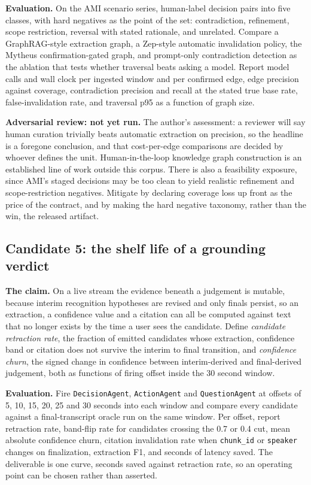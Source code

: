 \textbf{Evaluation.} On the AMI scenario series, human-label decision pairs
into five classes, with hard negatives as the point of the set: contradiction,
refinement, scope restriction, reversal with stated rationale, and unrelated.
Compare a GraphRAG-style extraction graph, a Zep-style automatic invalidation
policy, the Mytheus confirmation-gated graph, and prompt-only contradiction
detection as the ablation that tests whether traversal beats asking a model.
Report model calls and wall clock per ingested window and per confirmed edge,
edge precision against coverage, contradiction precision and recall at the
stated true base rate, false-invalidation rate, and traversal p95 as a function
of graph size.

\textbf{Adversarial review: not yet run.} The author's assessment: a reviewer
will say human curation trivially beats automatic extraction on precision, so
the headline is a foregone conclusion, and that cost-per-edge comparisons are
decided by whoever defines the unit. Human-in-the-loop knowledge graph
construction is an established line of work outside this corpus. There is also
a feasibility exposure, since AMI's staged decisions may be too clean to yield
realistic refinement and scope-restriction negatives. Mitigate by declaring
coverage loss up front as the price of the contract, and by making the hard
negative taxonomy, rather than the win, the released artifact.

\subsection{Candidate 5: the shelf life of a grounding verdict}

\textbf{The claim.} On a live stream the evidence beneath a judgement is
mutable, because interim recognition hypotheses are revised and only finals
persist, so an extraction, a confidence value and a citation can all be
computed against text that no longer exists by the time a user sees the
candidate. Define \emph{candidate retraction rate}, the fraction of emitted
candidates whose extraction, confidence band or citation does not survive the
interim to final transition, and \emph{confidence churn}, the signed change in
confidence between interim-derived and final-derived judgement, both as
functions of firing offset inside the 30 second window.

\textbf{Evaluation.} Fire \texttt{DecisionAgent}, \texttt{ActionAgent} and
\texttt{QuestionAgent} at offsets of 5, 10, 15, 20, 25 and 30 seconds into each
window and compare every candidate against a final-transcript oracle run on the
same window. Per offset, report retraction rate, band-flip rate for candidates
crossing the 0.7 or 0.4 cut, mean absolute confidence churn, citation
invalidation rate when \texttt{chunk\_id} or \texttt{speaker} changes on
finalization, extraction F1, and seconds of latency saved. The deliverable is
one curve, seconds saved against retraction rate, so an operating point can be
chosen rather than asserted.


